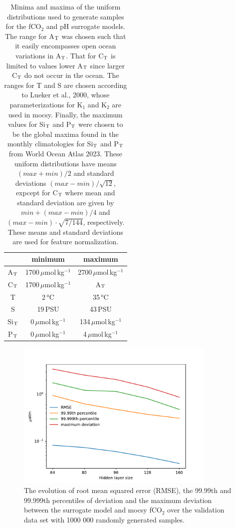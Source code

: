 \documentclass{article}
\begin{document}
	\begin{table}
		\centering
		\bgroup
		\def\arraystretch{1.5}
		\begin{tabular}{c|c|c}
			& minimum & maximum \\
			\hline 
			A$_\textup{T}$ & 1700\,$\mu$mol\,kg$^{-1}$ & 2700\,$\mu$mol\,kg$^{-1}$ \\
			\hline
			C$_\textup{T}$ & 1700\,$\mu$mol\,kg$^{-1}$ & A$_\textup{T}$ \\
			\hline
			T & 2\,°C & 35\,°C \\
			\hline
			S & 19\,PSU & 43\,PSU \\
			\hline
			Si$_\textup{T}$ & 0\,$\mu$mol\,kg$^{-1}$ & 134\,$\mu$mol\,kg$^{-1}$ \\
			\hline
			P$_\textup{T}$ & 0\,$\mu$mol\,kg$^{-1}$ & 4\,$\mu$mol\,kg$^{-1}$ \\
			
		\end{tabular}
		\egroup
		\caption{Minima and maxima of the uniform distributions used to generate samples for the fCO$_2$ and pH surrogate models. The range for A$_\textup{T}$ was chosen such that it easily encompasses open ocean variations in A$_\textup{T}$. That for C$_\textup{T}$ is limited to values lower A$_\textup{T}$ since larger C$_\textup{T}$ do not occur in the ocean. The ranges for T and S are chosen according to Lueker et al., 2000, whose parameterizations for K$_1$ and K$_2$ are used in mocsy. Finally, the maximum values for Si$_\textup{T}$ and P$_\textup{T}$ were chosen to be the global maxima found in the monthly climatologies for Si$_\textup{T}$ and P$_\textup{T}$ from World Ocean Atlas 2023. These uniform distributions have means $(max + min) / 2$ and standard deviations $(max - min) / \sqrt{12}$, expcept for C$_\textup{T}$ where mean and standard deviation are given by $min + (max - min) / 4$ and $(max - min) \cdot \sqrt{7 / 144}$, respectively. These means and standard deviations are used for feature normalization.}
		\label{tab:gen_data}
	\end{table}
	\begin{figure}
		\includegraphics[width=0.85\textwidth]{./figures/fco2_model_error_vs_hidden_layer_size.pdf}
		\caption{The evolution of root mean squared error (RMSE), the 99.99th and 99.999th percentiles of deviation and the maximum deviation between the surrogate model and mocsy fCO$_2$ over the validation data set with 1000 000 randomly generated samples.}
		\label{fig:fco2_model}
	\end{figure}
\end{document}
